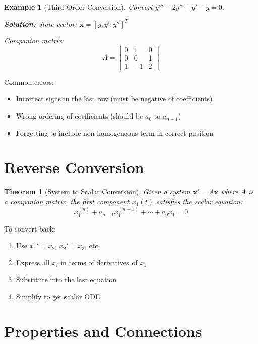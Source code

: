 \documentclass[12pt]{article}
\newtheorem{theorem}{Theorem}
\newtheorem{example}{Example}
\begin{document}
\begin{example}[Third-Order Conversion]
Convert $y''' - 2y'' + y' - y = 0$.

\textbf{Solution:}
State vector: $\mathbf{x} = [y, y', y'']^{T}$

Companion matrix:
$$A = \begin{bmatrix} 0 & 1 & 0 \\ 0 & 0 & 1 \\ 1 & -1 & 2 \end{bmatrix}$$
\end{example}

\begin{warning}
Common errors:
\begin{itemize}
\item Incorrect signs in the last row (must be negative of coefficients)
\item Wrong ordering of coefficients (should be $a_{0}$ to $a_{n-1}$)
\item Forgetting to include non-homogeneous term in correct position
\end{itemize}
\end{warning}

\section{Reverse Conversion}

\begin{theorem}[System to Scalar Conversion]
Given a system $\mathbf{x}' = A\mathbf{x}$ where $A$ is a companion matrix, the first component $x_{1}(t)$ satisfies the scalar equation:
$$x_{1}^{(n)} + a_{n-1}x_{1}^{(n-1)} + \cdots + a_{0}x_1 = 0$$
\end{theorem}

\begin{computation}
To convert back:
\begin{enumerate}
\item Use $x_{1}' = x_{2}$, $x_{2}' = x_{3}$, etc.
\item Express all $x_i$ in terms of derivatives of $x_{1}$
\item Substitute into the last equation
\item Simplify to get scalar ODE
\end{enumerate}
\end{computation}

\section{Properties and Connections}
\end{document}
